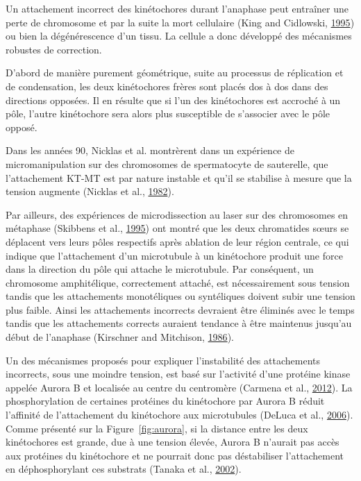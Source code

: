 \documentclass[12pt,a4paper,twoside,openright]{book}
\begin{document}
Un attachement incorrect des kinétochores durant l'anaphase peut
entraîner une perte de chromosome et par la suite la mort cellulaire
(King and Cidlowski, \protect\hyperlink{ref-King1995}{1995}) ou bien la
dégénérescence d'un tissu. La cellule a donc développé des mécanismes
robustes de correction.

D'abord de manière purement géométrique, suite au processus de
réplication et de condensation, les deux kinétochores frères sont placés
dos à dos dans des directions opposées. Il en résulte que si l'un des
kinétochores est accroché à un pôle, l'autre kinétochore sera alors plus
susceptible de s'associer avec le pôle opposé.

Dans les années 90, Nicklas et al. montrèrent dans un expérience de
micromanipulation sur des chromosomes de spermatocyte de sauterelle, que
l'attachement KT-MT est par nature instable et qu'il se stabilise à
mesure que la tension augmente (Nicklas et al.,
\protect\hyperlink{ref-Nicklas1982}{1982}).

Par ailleurs, des expériences de microdissection au laser sur des
chromosomes en métaphase (Skibbens et al.,
\protect\hyperlink{ref-Skibbens1995}{1995}) ont montré que les deux
chromatides sœurs se déplacent vers leurs pôles respectifs après
ablation de leur région centrale, ce qui indique que l'attachement d'un
microtubule à un kinétochore produit une force dans la direction du pôle
qui attache le microtubule. Par conséquent, un chromosome amphitélique,
correctement attaché, est nécessairement sous tension tandis que les
attachements monotéliques ou syntéliques doivent subir une tension plus
faible. Ainsi les attachements incorrects devraient être éliminés avec
le temps tandis que les attachements corrects auraient tendance à être
maintenus jusqu'au début de l'anaphase (Kirschner and Mitchison,
\protect\hyperlink{ref-Kirschner1986}{1986}).

Un des mécanismes proposés pour expliquer l'instabilité des attachements
incorrects, sous une moindre tension, est basé sur l'activité d'une
protéine kinase appelée Aurora B et localisée au centre du centromère
(Carmena et al., \protect\hyperlink{ref-Carmena2012a}{2012}). La
phosphorylation de certaines protéines du kinétochore par Aurora B
réduit l'affinité de l'attachement du kinétochore aux microtubules
(DeLuca et al., \protect\hyperlink{ref-DeLuca2006}{2006}). Comme
présenté sur la Figure~\ref{fig:aurora}, si la distance entre les deux
kinétochores est grande, due à une tension élevée, Aurora B n'aurait pas
accès aux protéines du kinétochore et ne pourrait donc pas déstabiliser
l'attachement en déphosphorylant ces substrats (Tanaka et al.,
\protect\hyperlink{ref-Tanaka2002}{2002}).
\end{document}
